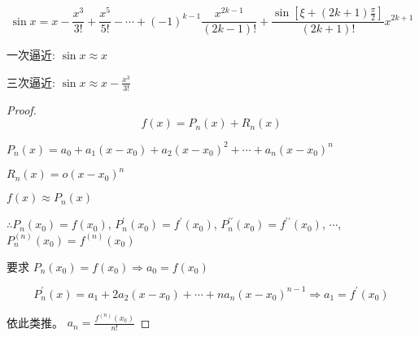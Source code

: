 \begin{example}
    \begin{equation} \sin x= x-\frac{x^{3}}{3 !}+\frac{x^{5}}{5 !}-\cdots+(-1)^{k-1} \frac{x^{2 k-1}}{(2 k-1) !}+\frac{\sin \left[\xi+(2 k+1) \frac{\pi}{2}\right]}{(2 k+1) !} x^{2 k+1} \end{equation}

    一次逼近: $  \sin x \approx x $

    三次逼近: $  \sin x \approx x-\frac{x^{3}}{3 !} $
\end{example}

\begin{proof}
    \begin{equation} f(x)=P_{n}(x)+R_{n}(x) \end{equation}
    
    $ P_{n}(x)=a_{0}+a_{1}\left(x-x_{0}\right)+a_{2}\left(x-x_{0}\right)^{2}+\cdots+a_{n}\left(x-x_{0}\right)^{n}  $

    $ R_{n}(x)=o\left(x-x_{0}\right)^{n} $

    $ f(x) \approx P_{n}(x) $

    $\therefore  P_{n}\left(x_{0}\right)=f\left(x_{0}\right) $,
    $ P_{n}^{\prime}\left(x_{0}\right)=f^{\prime}\left(x_{0}\right) $,
    $ P_{n}^{\prime \prime}\left(x_{0}\right)=f^{\prime \prime}\left(x_{0}\right) $,
    $ \cdots  $,
    $ P_{n}^{(n)}\left(x_{0}\right)=f^{(n)}\left(x_{0}\right) $

    要求 $ P_{n}\left(x_{0}\right)=f\left(x_{0}\right) \Rightarrow  a_{0}=f\left(x_{0}\right)  $

    \begin{equation} P_{n}^{\prime}(x)=a_{1}+2 a_{2}\left(x-x_{0}\right)+\cdots+n a_{n}\left(x-x_{0}\right)^{n-1} \Rightarrow  a_{1}=f^{\prime}\left(x_{0}\right)  \end{equation}

    依此类推。 $a_{n}=\frac{f^{(n)}\left(x_{0}\right)}{n !} $
\end{proof}